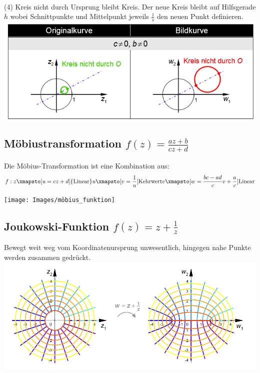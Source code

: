 ~\\
\noindent (4) Kreis nicht durch Ursprung bleibt Kreis. Der neue Kreis bleibt auf Hilfsgerade $h$ wobei Schnittpunkte und Mittelpunkt jeweils $\frac{1}{s}$ den neuen Punkt definieren. \\
\includegraphics[width=\columnwidth]{Images/kreisspiegelung_kreis_no}

\subsection{Möbiustransformation $f(z) = \frac{az+b}{cz+d}$}
Die Möbius-Transformation ist eine Kombination aus:
\[
f: z \xmapsto[u=cz+d]{\text{Linear}} u \xmapsto[v=\frac{1}{u}]{\text{Kehrwert}} v \xmapsto[w=\frac{bc-ad}{c}v+\frac{a}{c}]{\text{Linear}}
\]

\texttt{[image: Images/möbius\_funktion]}

\subsection{Joukowski-Funktion $f(z) = z + \frac{1}{z}$}
Bewegt weit weg vom Koordinatenursprung unwesentlich, hingegen nahe Punkte werden zusammen gedrückt.\\
\includegraphics[width=\columnwidth]{Images/joukowski_funktion}


